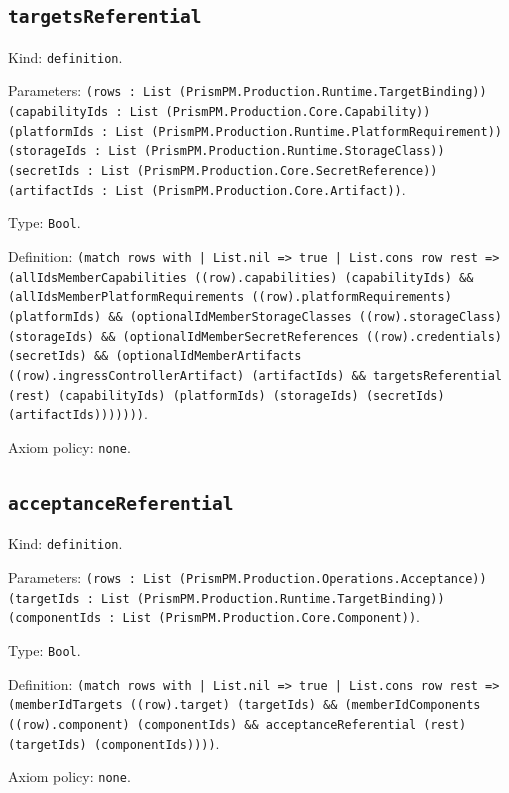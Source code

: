 \documentclass[11pt]{article}
\begin{document}
\subsection*{\texttt{targetsReferential}}
\noindent Kind: \texttt{definition}.\par
\noindent Parameters: \texttt{(rows : List (PrismPM.Production.Runtime.TargetBinding)) (capabilityIds : List (PrismPM.Production.Core.Capability)) (platformIds : List (PrismPM.Production.Runtime.PlatformRequirement)) (storageIds : List (PrismPM.Production.Runtime.StorageClass)) (secretIds : List (PrismPM.Production.Core.SecretReference)) (artifactIds : List (PrismPM.Production.Core.Artifact))}.\par
\noindent Type: \texttt{Bool}.\par
\noindent Definition: \texttt{(match rows with | List.nil => true | List.cons row rest => (allIdsMemberCapabilities ((row).capabilities) (capabilityIds) \&\& (allIdsMemberPlatformRequirements ((row).platformRequirements) (platformIds) \&\& (optionalIdMemberStorageClasses ((row).storageClass) (storageIds) \&\& (optionalIdMemberSecretReferences ((row).credentials) (secretIds) \&\& (optionalIdMemberArtifacts ((row).ingressControllerArtifact) (artifactIds) \&\& targetsReferential (rest) (capabilityIds) (platformIds) (storageIds) (secretIds) (artifactIds)))))))}.\par
\noindent Axiom policy: \texttt{none}.\par
\subsection*{\texttt{acceptanceReferential}}
\noindent Kind: \texttt{definition}.\par
\noindent Parameters: \texttt{(rows : List (PrismPM.Production.Operations.Acceptance)) (targetIds : List (PrismPM.Production.Runtime.TargetBinding)) (componentIds : List (PrismPM.Production.Core.Component))}.\par
\noindent Type: \texttt{Bool}.\par
\noindent Definition: \texttt{(match rows with | List.nil => true | List.cons row rest => (memberIdTargets ((row).target) (targetIds) \&\& (memberIdComponents ((row).component) (componentIds) \&\& acceptanceReferential (rest) (targetIds) (componentIds))))}.\par
\noindent Axiom policy: \texttt{none}.\par
\end{document}

